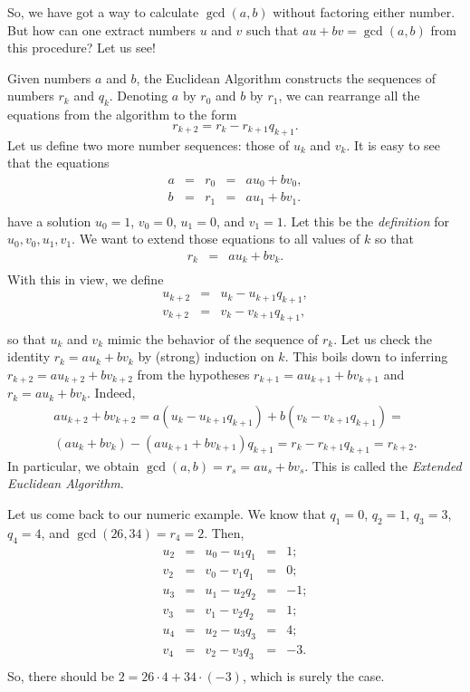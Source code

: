 \documentclass[12pt,notitlepage]{article}
\theoremstyle{plain}
\theoremstyle{definition}
\theoremstyle{plain}
\newcommand{\1}{\mathbf{1}}
\newcommand{\0}{\mathbf{0}}
\begin{document}
So, we have got a way to calculate $\gcd(a, b)$ without factoring either number. But how can one extract numbers $u$ and $v$ such that $a u + b v = \gcd(a, b)$ from this procedure? Let us see!

Given numbers $a$ and $b$, the Euclidean Algorithm constructs the sequences of numbers $r_k$ and $q_k$. Denoting $a$ by $r_0$ and $b$ by $r_1$, we can rearrange all the equations from the algorithm to the form
$$r_{k+2} = r_k - r_{k+1}q_{k+1}.$$
Let us define two more number sequences: those of $u_k$ and $v_k$. It is easy to see that the equations
$$
\begin{array}{lcccl}
	a &=& r_0 &=& au_0 + bv_0,\\
	b &=& r_1 &=& au_1 + bv_1.\\
\end{array}
$$
have a solution $u_0 = 1$, $v_0 = 0$, $u_1 = 0$, and $v_1 = 1$. Let this be the \emph{definition} for $u_0, v_0, u_1, v_1$. We want to extend those equations to all values of $k$ so that
$$
\begin{array}{lcl}
	r_k &=& au_k + bv_k.\\
\end{array}
$$
With this in view, we define
$$
\begin{array}{lcl}
	u_{k+2} &=& u_k - u_{k+1}q_{k+1},\\
	v_{k+2} &=& v_k - v_{k+1}q_{k+1},\\
\end{array}
$$
so that $u_k$ and $v_k$ mimic the behavior of the sequence of $r_k$. Let us check the identity $r_k = au_k + bv_k$ by (strong) induction on $k$. This boils down to inferring $r_{k + 2} = a u_{k+2} + b v_{k+2}$ from the hypotheses $r_{k + 1} = a u_{k+1} + b v_{k+1}$ and $r_{k} = a u_{k} + b v_{k}$. Indeed,
\begin{multline*}
	a u_{k+2} + b v_{k+2} = a(u_k - u_{k+1}q_{k+1}) + b(v_k - v_{k+1}q_{k+1}) =\\
	(a u_k + b v_k) - (a u_{k+1} + b v_{k+1})q_{k+1} = r_k - r_{k+1}q_{k+1} = r_{k+2}. 
\end{multline*}
In particular, we obtain $\gcd(a, b) = r_s = a u_s + b v_s$. This is called the \emph{Extended Euclidean Algorithm}.

Let us come back to our numeric example. We know that $q_1 = 0$, $q_2 = 1$, $q_3 = 3$, $q_4 = 4$, and $\gcd(26, 34) = r_4 = 2$. Then,
$$
\begin{array}{lcccl}
	u_{2} &=& u_0 - u_{1}q_{1} &=& 1;\\
	v_{2} &=& v_0 - v_{1}q_{1} &=& 0;\\
	u_{3} &=& u_1 - u_{2}q_{2} &=& -1;\\
	v_{3} &=& v_1 - v_{2}q_{2} &=& 1;\\
	u_{4} &=& u_2 - u_{3}q_{3} &=& 4;\\
	v_{4} &=& v_2 - v_{3}q_{3} &=& -3.\\
\end{array}
$$
So, there should be $2 = 26 \cdot 4 + 34 \cdot (-3)$, which is surely the case. 
\end{document}

